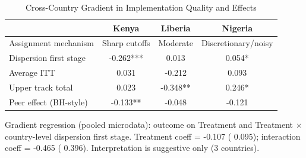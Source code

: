 \begin{table}[!htbp]
\centering
\caption{Cross-Country Gradient in Implementation Quality and Effects}
\label{tab:pooled_gradient}
\begin{threeparttable}
\begin{tabular}[t]{lccc}
\toprule
 & Kenya & Liberia & Nigeria \\
\midrule
Assignment mechanism & Sharp cutoffs & Moderate & Discretionary/noisy \\
Dispersion first stage &  -0.262*** &   0.013 &   0.054* \\
Average ITT &   0.031 &  -0.212 &   0.093 \\
Upper track total &   0.023 &  -0.348** &   0.246* \\
Peer effect (BH-style) &  -0.133** &  -0.048 &  -0.121 \\
\bottomrule
\end{tabular}
\begin{tablenotes}[para]
\item Gradient regression (pooled microdata): outcome on Treatment and Treatment $\times$ country-level dispersion first stage. 
Treatment coeff =  -0.107 (  0.095); interaction coeff =  -0.465 (  0.396). 
Interpretation is suggestive only (3 countries).
\end{tablenotes}
\end{threeparttable}
\end{table}
